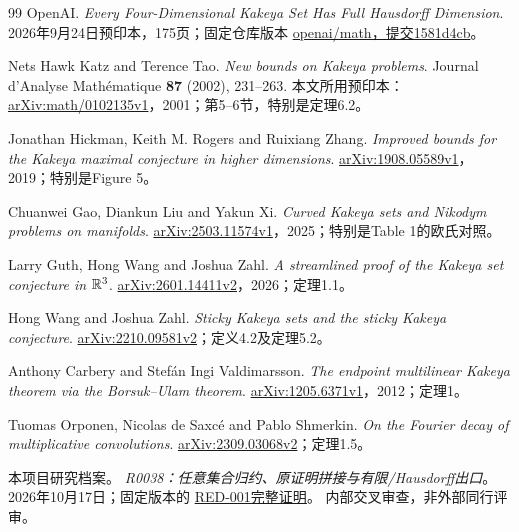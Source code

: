 \begin{thebibliography}{99}
OpenAI.
\emph{Every Four-Dimensional Kakeya Set Has Full Hausdorff Dimension}.
2026年9月24日预印本，175页；固定仓库版本
\href{https://github.com/openai/math/tree/1581d4cbdd69a0faf34b2089614fe2a814316a6a/preprints/Every-four-dimensional-Kakeya-set-has-full-Hausdorff-dimension-September-24-2026}{openai/math，提交1581d4cb}。

Nets Hawk Katz and Terence Tao.
\emph{New bounds on Kakeya problems}.
Journal d'Analyse Math\'ematique \textbf{87} (2002), 231--263.
本文所用预印本：\href{https://arxiv.org/abs/math/0102135v1}{arXiv:math/0102135v1}，2001；第5--6节，特别是定理6.2。

Jonathan Hickman, Keith M. Rogers and Ruixiang Zhang.
\emph{Improved bounds for the Kakeya maximal conjecture in higher dimensions}.
\href{https://arxiv.org/abs/1908.05589v1}{arXiv:1908.05589v1}，2019；特别是Figure 5。

Chuanwei Gao, Diankun Liu and Yakun Xi.
\emph{Curved Kakeya sets and Nikodym problems on manifolds}.
\href{https://arxiv.org/abs/2503.11574v1}{arXiv:2503.11574v1}，2025；特别是Table 1的欧氏对照。

Larry Guth, Hong Wang and Joshua Zahl.
\emph{A streamlined proof of the Kakeya set conjecture in $\mathbb R^3$}.
\href{https://arxiv.org/abs/2601.14411v2}{arXiv:2601.14411v2}，2026；定理1.1。

Hong Wang and Joshua Zahl.
\emph{Sticky Kakeya sets and the sticky Kakeya conjecture}.
\href{https://arxiv.org/abs/2210.09581v2}{arXiv:2210.09581v2}；定义4.2及定理5.2。

Anthony Carbery and Stef\'an Ingi Valdimarsson.
\emph{The endpoint multilinear Kakeya theorem via the Borsuk--Ulam theorem}.
\href{https://arxiv.org/abs/1205.6371v1}{arXiv:1205.6371v1}，2012；定理1。

Tuomas Orponen, Nicolas de Saxc\'e and Pablo Shmerkin.
\emph{On the Fourier decay of multiplicative convolutions}.
\href{https://arxiv.org/abs/2309.03068v2}{arXiv:2309.03068v2}；定理1.5。

本项目研究档案。
\emph{R0038：任意集合归约、原证明拼接与有限/Hausdorff出口}。
2026年10月17日；固定版本的
\href{https://github.com/lixiang90/kakeya_research/blob/774c3614ec3e810c127c875a9f5abb60748be848/notes/10_source_audit/source_assembly/R0038_reduction_source_assembly_and_finite_readout_full_proof.md}{RED-001完整证明}。
内部交叉审查，非外部同行评审。


\end{thebibliography}

